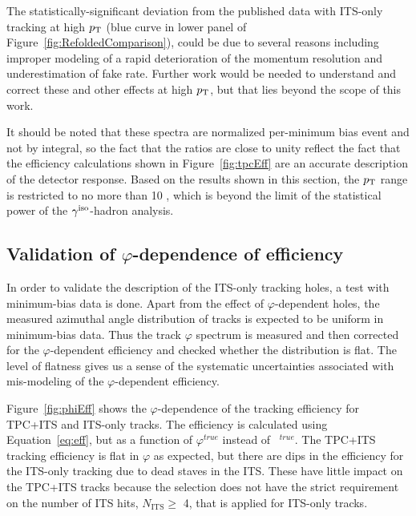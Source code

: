 The statistically-significant deviation from the published data with ITS-only tracking at high $p_{\mathrm{T}}$ (blue curve in lower panel of Figure~\ref{fig:RefoldedComparison}), could be due to several reasons  including improper modeling of a rapid deterioration of the momentum resolution and underestimation of fake rate. Further work would be needed to understand and correct these and other effects at high $p_{\mathrm{T}}$, but that lies beyond the scope of this work. 

It should be noted that these spectra are normalized per-minimum bias event and not by integral, so the fact that the ratios are close to unity reflect the fact that the efficiency calculations shown in Figure~\ref{fig:tpcEff} are an accurate description of the detector response. Based on the results shown in this section, the $p_{\mathrm{T}}$ range is restricted to no more than 10 \GeVc, which is beyond the limit of the statistical power of the $\gamma^\mathrm{iso}$-hadron analysis.

\subsection{Validation of $\varphi$-dependence of efficiency}
\label{sec:phicheck}

In order to validate the description of the ITS-only tracking holes, a test with minimum-bias data is done. Apart from the effect of $\varphi$-dependent holes, the measured azimuthal angle distribution of tracks is expected to be uniform in minimum-bias data. Thus the track $\varphi$ spectrum is measured and then corrected for the $\varphi$-dependent efficiency and checked whether the distribution is flat. The level of flatness gives us a sense of the systematic uncertainties associated with mis-modeling of the $\varphi$-dependent efficiency.

Figure~\ref{fig:phiEff} shows the $\varphi$-dependence of the tracking efficiency for TPC+ITS and ITS-only tracks. The efficiency is calculated using Equation~\ref{eq:eff}, but as a function of $\varphi^{true}$ instead of \pt~$^{true}$. The TPC+ITS tracking efficiency is flat in $\varphi$ as expected, but there are dips in the efficiency for the ITS-only tracking due to dead staves in the ITS. These have little impact on the TPC+ITS tracks because the selection does not have the strict requirement on the number of ITS hits, $N_{\mathrm{ITS}} \geq$ 4, that is applied for ITS-only tracks. 

